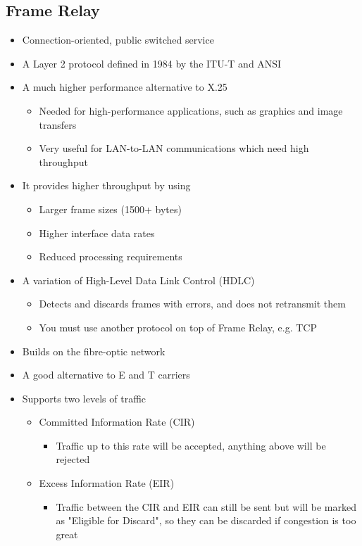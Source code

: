 \subsection*{Frame Relay}

\begin{itemize}
  \item Connection-oriented, public switched service
  \item A Layer 2 protocol defined in 1984 by the ITU-T and ANSI
  \item A much higher performance alternative to X.25
  \begin{itemize}
    \item Needed for high-performance applications, such as graphics and image transfers
    \item Very useful for LAN-to-LAN communications which need high throughput
  \end{itemize}
  \item It provides higher throughput by using
  \begin{itemize}
    \item Larger frame sizes (1500+ bytes)
    \item Higher interface data rates
    \item Reduced processing requirements
  \end{itemize}
  \item A variation of High-Level Data Link Control (HDLC)
  \begin{itemize}
    \item Detects and discards frames with errors, and does not retransmit them
    \item You must use another protocol on top of Frame Relay, e.g. TCP
  \end{itemize}
  \item Builds on the fibre-optic network
  \item A good alternative to E and T carriers
  \item Supports two levels of traffic
  \begin{itemize}
    \item Committed Information Rate (CIR)
    \begin{itemize}
      \item Traffic up to this rate will be accepted, anything above will be rejected
    \end{itemize}
    \item Excess Information Rate (EIR)
    \begin{itemize}
        \item Traffic between the CIR and EIR can still be sent but will be marked as "Eligible for Discard", so they can be discarded if congestion is too great

\end{itemize}
\end{itemize}
\end{itemize}
